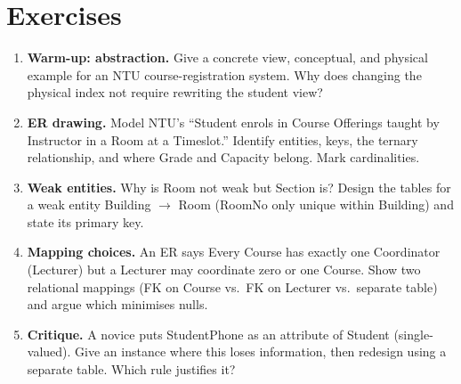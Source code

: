 \section{Exercises}
\label{sec:ch01-ex}
\begin{enumerate}[label=E1.\arabic*, leftmargin=*, itemsep=0.75em]
    \item \textbf{Warm-up: abstraction.} Give a concrete view, conceptual, and physical example for an NTU course-registration system. Why does changing the physical index not require rewriting the student view?
    \item \textbf{ER drawing.} Model NTU's ``Student enrols in Course Offerings taught by Instructor in a Room at a Timeslot.'' Identify entities, keys, the ternary relationship, and where Grade and Capacity belong. Mark cardinalities.
    \item \textbf{Weak entities.} Why is Room not weak but Section is? Design the tables for a weak entity Building $\to$ Room (RoomNo only unique within Building) and state its primary key.
    \item \textbf{Mapping choices.} An ER says Every Course has exactly one Coordinator (Lecturer) but a Lecturer may coordinate zero or one Course. Show two relational mappings (FK on Course vs.\ FK on Lecturer vs.\ separate table) and argue which minimises nulls.
    \item \textbf{Critique.} A novice puts StudentPhone as an attribute of Student (single-valued). Give an instance where this loses information, then redesign using a separate table. Which rule justifies it?
\end{enumerate}
